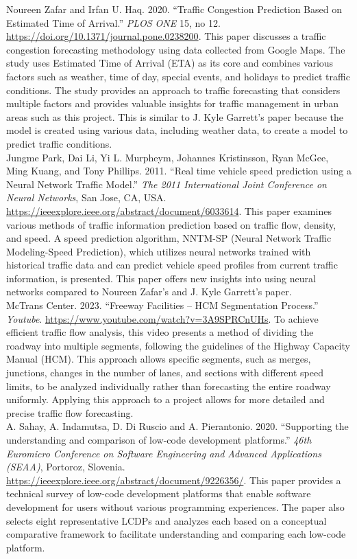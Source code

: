 \documentclass[12pt]{article}
\begin{document}
Noureen Zafar and Irfan U. Haq. 2020. ``Traffic Congestion Prediction Based on Estimated Time of Arrival.'' {\it PLOS ONE} 15, no 12. \url{https://doi.org/10.1371/journal.pone.0238200}.
This paper discusses a traffic congestion forecasting methodology using data collected from Google Maps. The study uses Estimated Time of Arrival (ETA) as its core and combines various factors such as weather, time of day, special events, and holidays to predict traffic conditions. The study provides an approach to traffic forecasting that considers multiple factors and provides valuable insights for traffic management in urban areas such as this project. This is similar to J. Kyle Garrett’s paper because the model is created using various data, including weather data, to create a model to predict traffic conditions. \\

Jungme Park, Dai Li, Yi L. Murpheym, Johannes Kristinsson, Ryan McGee, Ming Kuang, and Tony Phillips. 2011. ``Real time vehicle speed prediction using a Neural Network Traffic Model.'' {\it The 2011 International Joint Conference on Neural Networks}, San Jose, CA, USA. \url{https://ieeexplore.ieee.org/abstract/document/6033614}.
This paper examines various methods of traffic information prediction based on traffic flow, density, and speed. A speed prediction algorithm, NNTM-SP (Neural Network Traffic Modeling-Speed Prediction), which utilizes neural networks trained with historical traffic data and can predict vehicle speed profiles from current traffic information, is presented. This paper offers new insights into using neural networks compared to Noureen Zafar’s and J. Kyle Garrett’s paper. \\

McTrans Center. 2023. ``Freeway Facilities – HCM Segmentation Process.'' {\it Youtube}. \url{https://www.youtube.com/watch?v=3A9SPRCnUHs}.
To achieve efficient traffic flow analysis, this video presents a method of dividing the roadway into multiple segments, following the guidelines of the Highway Capacity Manual (HCM). This approach allows specific segments, such as merges, junctions, changes in the number of lanes, and sections with different speed limits, to be analyzed individually rather than forecasting the entire roadway uniformly. Applying this approach to a project allows for more detailed and precise traffic flow forecasting. \\

A. Sahay, A. Indamutsa, D. Di Ruscio and A. Pierantonio. 2020. ``Supporting the understanding and comparison of low-code development platforms.'' {\it 46th Euromicro Conference on Software Engineering and Advanced Applications (SEAA)}, Portoroz, Slovenia. \url{https://ieeexplore.ieee.org/abstract/document/9226356/}.
This paper provides a technical survey of low-code development platforms that enable software development for users without various programming experiences. The paper also selects eight representative LCDPs and analyzes each based on a conceptual comparative framework to facilitate understanding and comparing each low-code platform. \\
\end{document}
